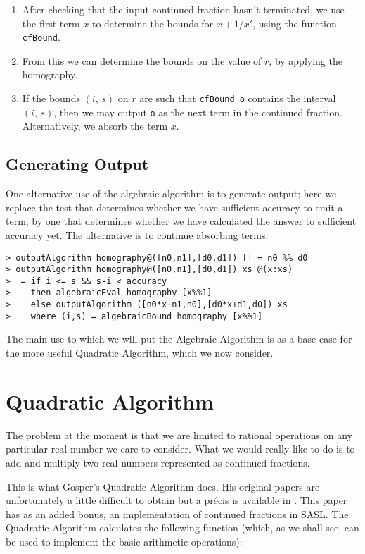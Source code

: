 \begin{enumerate}
\item After checking that the input continued fraction hasn't terminated,
we use the first term $x$ to determine the bounds for $x+1/x'$, using
the function \mbox{\tt cfBound}.
\item From this we can determine the bounds on the value of $r$, by
applying the homography.
\item If the bounds $(i,\,s)$ on $r$ are such that \mbox{\tt cfBound\ o}
contains the interval $(i,\,s)$, then we may output \mbox{\tt o} as the next
term in the continued fraction.  Alternatively, we absorb the term
$x$.
\end{enumerate}

\subsection{Generating Output}

One alternative use of the algebraic algorithm is to generate output;
here we replace the test that determines whether we have sufficient
accuracy to emit a term, by one that determines whether we have
calculated the answer to sufficient accuracy yet. The alternative is
to continue absorbing terms.
\begin{verbatim}
> outputAlgorithm homography@([n0,n1],[d0,d1]) [] = n0 %% d0
> outputAlgorithm homography@([n0,n1],[d0,d1]) xs'@(x:xs)
>  = if i <= s && s-i < accuracy
>    then algebraicEval homography [x%%1]
>    else outputAlgorithm ([n0*x+n1,n0],[d0*x+d1,d0]) xs
>    where (i,s) = algebraicBound homography [x%%1]
\end{verbatim}
%
%
The main use to which we will put the Algebraic Algorithm is as a base
case for the more useful Quadratic Algorithm, which we now consider.

\section{Quadratic Algorithm}
\label{sc:qa}

The problem at the moment is that we are limited to rational
operations on any particular real number we care to consider. What we
would really like to do is to add and multiply two real numbers
represented as continued fractions.

This is what Gosper's Quadratic Algorithm does. His original papers
 are unfortunately a little difficult to
obtain but a pr\'{e}cis is available in \cite{PEYTON-JONES84b}. This
paper has as an added bonus, an implementation of continued fractions
in SASL. The Quadratic Algorithm calculates the following function
(which, as we shall see, can be used to implement the basic arithmetic
operations):

